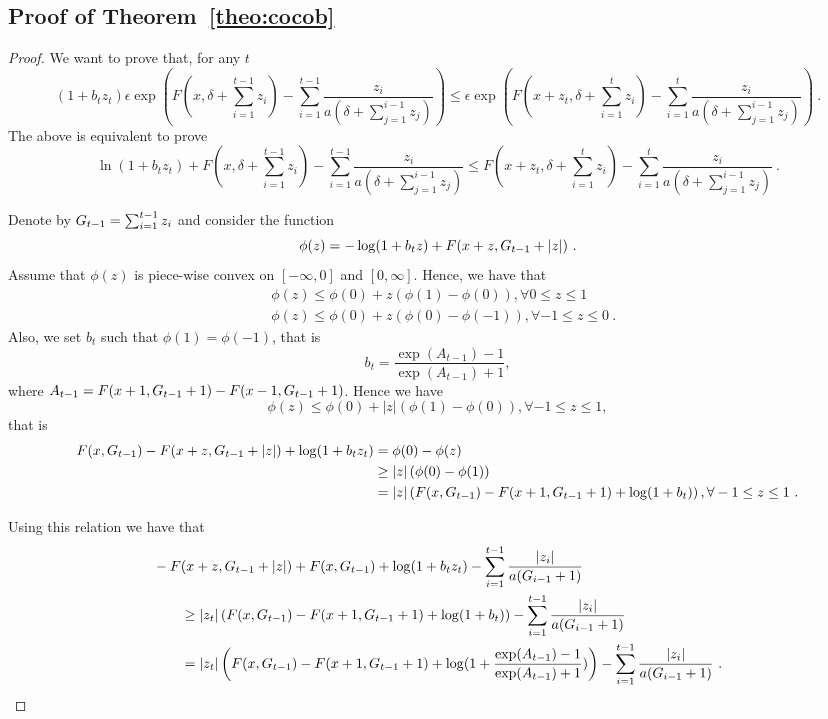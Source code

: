 \subsection{Proof of Theorem~\ref{theo:cocob}}
\begin{proof}
We want to prove that, for any $t$
\[
(1+b_t z_t) \epsilon \exp\left( F(x,\delta+\sum_{i=1}^{t-1} z_i) - \sum_{i=1}^{t-1} \frac{z_i}{a (\delta+\sum_{j=1}^{i-1} z_j)}\right)
\leq \epsilon \exp\left(F(x+z_t,\delta+\sum_{i=1}^{t} z_i) - \sum_{i=1}^{t} \frac{z_i}{a (\delta+\sum_{j=1}^{i-1} z_j)}\right)~.
\]
The above is equivalent to prove
\[
\ln(1+b_t z_t) + F(x,\delta+\sum_{i=1}^{t-1} z_i)- \sum_{i=1}^{t-1} \frac{z_i}{a (\delta+\sum_{j=1}^{i-1} z_j)}
\leq F(x+z_t,\delta+\sum_{i=1}^{t} z_i)- \sum_{i=1}^{t} \frac{z_i}{a (\delta+\sum_{j=1}^{i-1} z_j)}~.
\]

Denote by $G_{t-1}=\sum_{i=1}^{t-1} z_i$ and consider the function 
\[
\phi(z)=-\log(1+b_t z) + F(x+z,G_{t-1} + |z|)~.
\]
Assume that $\phi(z)$ is piece-wise convex on $[-\infty,0]$ and $[0,\infty]$. Hence, we have that
\begin{align*}
&\phi(z) \leq \phi(0)+z (\phi(1)-\phi(0)), \forall 0 \leq z\leq 1\\
&\phi(z) \leq \phi(0)+z (\phi(0)-\phi(-1)), \forall -1 \leq z\leq 0~.
\end{align*}
Also, we set $b_t$ such that $\phi(1)=\phi(-1)$, that is
\[
b_t = \frac{\exp(A_{t-1})-1}{\exp(A_{t-1})+1},
\]
where $A_{t-1}=F(x+1,G_{t-1} + 1)-F(x-1,G_{t-1} + 1)$.
Hence we have
\[
\phi(z) \leq \phi(0)+ |z| (\phi(1)-\phi(0)), \forall -1 \leq z\leq 1,
\]
that is
\begin{align*}
F(x,G_{t-1})-F(x+z,G_{t-1}+|z|) + \log(1+b_t z_t) 
& = \phi(0) - \phi(z) \\
& \geq |z| \left(\phi(0) - \phi(1)\right) \\
&= |z| \left(F(x,G_{t-1}) - F(x+1,G_{t-1}+1) + \log(1+b_t)\right), \forall -1 \leq z\leq 1~.
\end{align*}

Using this relation we have that
\begin{align*}
&-F(x+z,G_{t-1}+|z|) + F(x,G_{t-1})+\log(1+b_t z_t)-\sum_{i=1}^{t-1} \frac{|z_i|}{a (G_{i-1} + 1)} \\
&\qquad \geq |z_t| \left(F(x,G_{t-1}) - F(x+1,G_{t-1}+1) + \log(1+b_t)\right) - \sum_{i=1}^{t-1} \frac{|z_i|}{a (G_{i-1} + 1)} \\
&\qquad = |z_t| \left(F(x,G_{t-1}) - F(x+1,G_{t-1}+1) + \log(1+\frac{\exp(A_{t-1})-1}{\exp(A_{t-1})+1})\right) - \sum_{i=1}^{t-1} \frac{|z_i|}{a (G_{i-1} + 1)}~.
\end{align*}


\end{proof}
